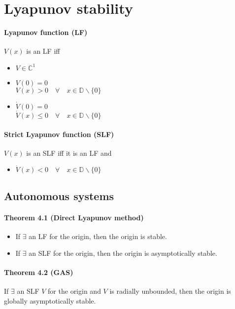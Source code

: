 \section{Lyapunov stability}

\paragraph{Lyapunov function (LF)}
$V(x)$ is an LF iff
\begin{itemize}
	\item $V \in \mathbb{C}^1$
	\item $V(0) = 0$ \\
	      $V(x) > 0 \quad \forall \quad x \in \mathbb{D} \backslash \{0\}$
	\item $\dot{V}(0) = 0$ \\
	      $\dot{V}(x) \leq 0 \quad \forall \quad x \in \mathbb{D} \backslash \{0\}$
\end{itemize}

\paragraph{Strict Lyapunov function (SLF)}
$V(x)$ is an SLF iff it is an LF and
\begin{itemize}
	\item $\dot{V}(x) < 0 \quad \forall \quad x \in \mathbb{D} \backslash \{0\}$
\end{itemize}

\subsection{Autonomous systems}
\paragraph{Theorem 4.1 (Direct Lyapunov method)}
\begin{itemize}
	\item If $\exists$ an LF for the origin, then the origin is stable.
	\item If $\exists$ an SLF for the origin, then the origin is asymptotically stable.
\end{itemize}

\paragraph{Theorem 4.2 (GAS)}
If $\exists$ an SLF $V$ for the origin and $V$ is radially unbounded, then the origin is globally asymptotically stable.

